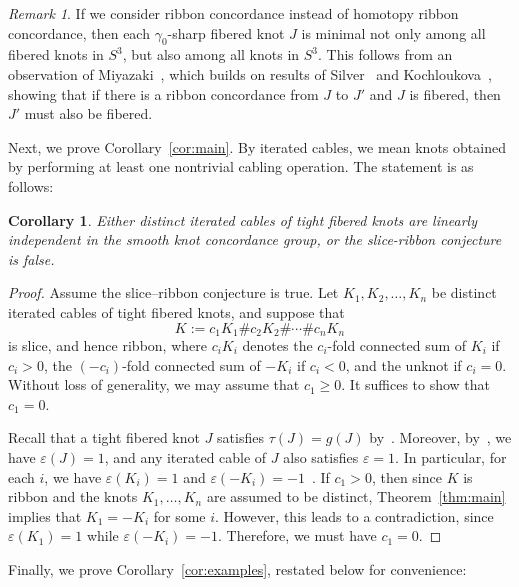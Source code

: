 \documentclass[11pt, reqno]{amsart}
\newtheorem{corollary}[theorem]{Corollary}
\theoremstyle{definition}
\theoremstyle{remark}
\newtheorem{remark}[theorem]{Remark}
\numberwithin{equation}{section}
\begin{document}
\begin{remark}
If we consider ribbon concordance instead of homotopy ribbon concordance,  
then each $\gamma_0$-sharp fibered knot $J$  is minimal not only among all fibered knots in $S^3$,  
but also among all knots in $S^3$.  
This follows from an observation of Miyazaki~\cite{Miyazaki:2018}, which builds on results of Silver~\cite{Silver:1992} and Kochloukova~\cite{Kochloukova:2006},  
showing that if there is a ribbon concordance from $J$ to $J'$ and $J$ is fibered, then $J'$ must also be fibered.
\end{remark}


Next, we prove Corollary~\ref{cor:main}. By iterated cables, we mean knots obtained by performing at least one nontrivial cabling operation. The statement is as follows:

\setcounter{corollary}{1}
\renewcommand{\thecorollary}{1.2}
\begin{corollary}\label{cor:mainbody}
Either distinct iterated cables of tight fibered knots are linearly independent in the smooth knot concordance group, or the slice-ribbon conjecture is false.
\end{corollary}

\begin{proof}
Assume the slice--ribbon conjecture is true.  
Let $K_1, K_2, \dots, K_n$ be distinct iterated cables of tight fibered knots, and suppose that  
\[
K := c_1K_1 \# c_2K_2 \# \cdots \# c_nK_n
\]
is slice, and hence ribbon, where $c_iK_i$ denotes the $c_i$-fold connected sum of $K_i$ if $c_i > 0$, the $(-c_i)$-fold connected sum of $-K_i$ if $c_i < 0$, and the unknot if $c_i = 0$.  
Without loss of generality, we may assume that $c_1 \geq 0$. It suffices to show that $c_1 = 0$.

Recall that a tight fibered knot $J$ satisfies $\tau(J) = g(J)$ by~\cite[Theorem~4]{Livingston:2004}.  
Moreover, by~\cite[Corollary~4 and Theorem~2]{Hom:2014}, we have $\varepsilon(J) = 1$, and any iterated cable of $J$ also satisfies $\varepsilon = 1$.  
In particular, for each $i$, we have $\varepsilon(K_i) = 1$ and $\varepsilon(-K_i) = -1$~\cite[Proposition~3.6]{Hom:2014}. If $c_1 > 0$, then since $K$ is ribbon and the knots $K_1, \dots, K_n$ are assumed to be distinct, Theorem~\ref{thm:main} implies that $K_1 = -K_i$ for some $i$.  
However, this leads to a contradiction, since $\varepsilon(K_1) = 1$ while $\varepsilon(-K_i) = -1$.  
Therefore, we must have $c_1 = 0$.
\end{proof}


Finally, we prove Corollary~\ref{cor:examples}, restated below for convenience:
\end{document}
